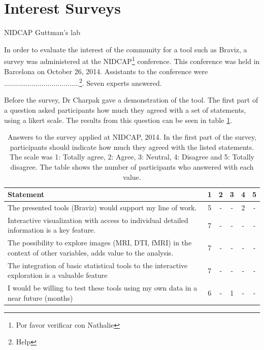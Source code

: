 


\section{Interest Surveys}
NIDCAP
Guttman's lab

In order to evaluate the interest of the community for a tool such as Braviz, a survey was administered at the NIDCAP\footnote{Por favor verificar con Nathalie} conference.  This conference was held in Barcelona on October 26, 2014. 
Assistants to the conference were ......................................\footnote{Help}. Seven experts answered.

Before the survey, Dr Charpak gave a demonstration of the tool. The first part of a question asked participants how much they agreed with a set of statements, using a likert scale. The results from this question can be seen in table \ref{tab_nidcap_likert}. 

\begin{table}
	\centering
		\begin{tabular}{p{}ccccc}
			\toprule
			Statement&1&2&3&4&5 \\
			\midrule
			The presented tools (Braviz) would support my line of work. & 5 &-&-& 2 &- \\
			Interactive visualization with access to individual detailed information is a key feature. &7&-&-&-&- \\			
			The possibility to explore images (MRI, DTI, fMRI) in the context of other variables, adds value to the analysis. &7&-&-&-&- \\
			The integration of basic statistical tools to the interactive exploration is a valuable feature &7&-&-&-&- \\
			I would be willing to test these tools using my own data in a near future (months) & 6 &-& 1 &-&- \\
			\bottomrule
		\end{tabular}
	\caption{Answers to the survey applied at NIDCAP, 2014. In the first part of the survey, participants should indicate how much they agreed with the listed statements. The scale was
	1: Totally agree, 2: Agree, 3: Neutral, 4: Disagree and 5: Totally disagree. The table shows the number of participants who answered with each value.}
	\label{tab_nidcap_likert}
\end{table}

